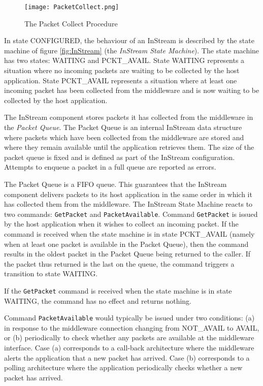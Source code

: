 \begin{figure}[h]
 \centering
 \texttt{[image: PacketCollect.png]}
 \caption{The Packet Collect Procedure}
 \label{fig:PacketCollect}
\end{figure}

In state CONFIGURED, the behaviour of an InStream is described by the state machine of figure \ref{fig:InStream} (the \textit{InStream State Machine}). The state machine has two states: WAITING and PCKT\_AVAIL. State WAITING represents a situation where no incoming packets are waiting to be collected by the host application. State PCKT\_AVAIL represents a situation where at least one incoming packet has been collected from the middleware and is now waiting to be collected by the host application. 

The InStream component stores packets it has collected from the middleware in the \textit{Packet Queue}. The Packet Queue is an internal InStream data structure where packets which have been collected from the middleware are stored and where they remain available until the application retrieves them. The size of the packet queue is fixed and is defined as part of the InStream configuration. Attempts to enqueue a packet in a full queue are reported as errors.

The Packet Queue is a FIFO queue. This guarantees that the InStream component delivers packets to its host application in the same order in which it has collected them from the middleware. The InStream State Machine reacts to two commands: \texttt{GetPacket} and \texttt{PacketAvailable}. Command \texttt{GetPacket} is issued by the host application when it wishes to collect an incoming packet. If the command is received when the state machine is in state PCKT\_AVAIL (namely when at least one packet is available in the Packet Queue), then the command results in the oldest packet in the Packet Queue being returned to the caller. If the packet thus returned is the last on the queue, the command triggers a transition to state WAITING. 

If the \texttt{GetPacket} command is received when the state machine is in state WAITING, the command has no effect and returns nothing.

Command \texttt{PacketAvailable} would typically be issued under two conditions: (a) in response to the middleware connection changing from NOT\_AVAIL to AVAIL, or (b) periodically to check whether any packets are available at the middleware interface. Case (a) corresponds to a call-back architecture where the middleware alerts the application that a new packet has arrived. Case (b) corresponds to a polling architecture where the application periodically checks whether a new packet has arrived. 

